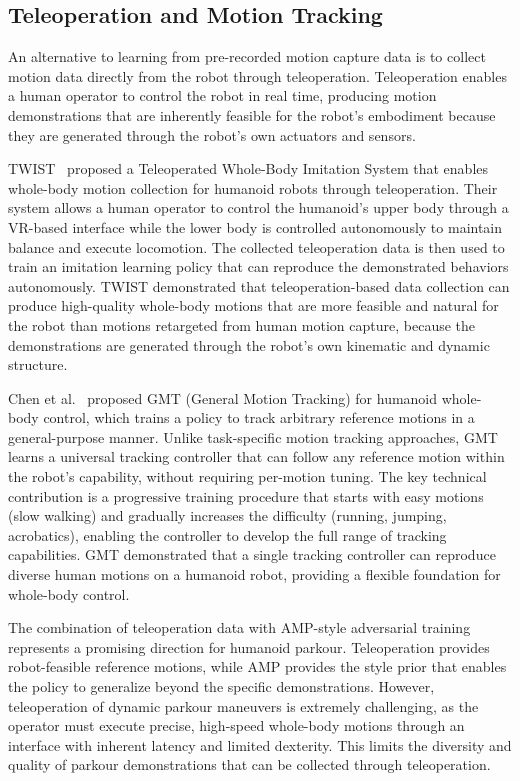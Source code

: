 \subsection{Teleoperation and Motion Tracking}

An alternative to learning from pre-recorded motion capture data is to collect motion data directly from the robot through teleoperation. Teleoperation enables a human operator to control the robot in real time, producing motion demonstrations that are inherently feasible for the robot's embodiment because they are generated through the robot's own actuators and sensors.

TWIST~\cite{ze2024twist} proposed a Teleoperated Whole-Body Imitation System that enables whole-body motion collection for humanoid robots through teleoperation. Their system allows a human operator to control the humanoid's upper body through a VR-based interface while the lower body is controlled autonomously to maintain balance and execute locomotion. The collected teleoperation data is then used to train an imitation learning policy that can reproduce the demonstrated behaviors autonomously. TWIST demonstrated that teleoperation-based data collection can produce high-quality whole-body motions that are more feasible and natural for the robot than motions retargeted from human motion capture, because the demonstrations are generated through the robot's own kinematic and dynamic structure.

Chen et al.~\cite{chen2024gmt} proposed GMT (General Motion Tracking) for humanoid whole-body control, which trains a policy to track arbitrary reference motions in a general-purpose manner. Unlike task-specific motion tracking approaches, GMT learns a universal tracking controller that can follow any reference motion within the robot's capability, without requiring per-motion tuning. The key technical contribution is a progressive training procedure that starts with easy motions (slow walking) and gradually increases the difficulty (running, jumping, acrobatics), enabling the controller to develop the full range of tracking capabilities. GMT demonstrated that a single tracking controller can reproduce diverse human motions on a humanoid robot, providing a flexible foundation for whole-body control.

The combination of teleoperation data with AMP-style adversarial training represents a promising direction for humanoid parkour. Teleoperation provides robot-feasible reference motions, while AMP provides the style prior that enables the policy to generalize beyond the specific demonstrations. However, teleoperation of dynamic parkour maneuvers is extremely challenging, as the operator must execute precise, high-speed whole-body motions through an interface with inherent latency and limited dexterity. This limits the diversity and quality of parkour demonstrations that can be collected through teleoperation.

